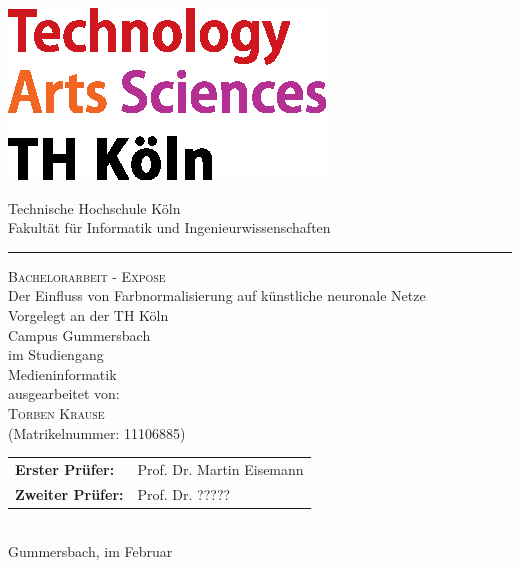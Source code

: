 \documentclass[a4paper,12pt,oneside]{article}
\begin{document}
  
  \pagestyle{empty}
  \begin{titlepage}
    \includegraphics[scale=1.00]{Sources/logo_TH-Koeln_CMYK_22pt}\\
    \begin{center}
      \Large
      Technische Hochschule Köln\\
      Fakultät für Informatik und Ingenieurwissenschaften\\
      \hrule\par\rule{0pt}{2cm} %
      \LARGE
      \textsc{Bachelorarbeit - Expose}\\
      \vspace{1cm} %
      \huge
      Der Einfluss von Farbnormalisierung auf künstliche neuronale Netze\\
      \vspace{1 cm}
      \large
      Vorgelegt an der TH Köln\\
      Campus Gummersbach\\
      im Studiengang\\
      Medieninformatik\\ 
      \vspace{1.0cm}
      ausgearbeitet von:\\
      \textsc{Torben Krause}\\
      (Matrikelnummer: 11106885)\\
      \vspace{1.5cm}
      \begin{tabular}{ll} %
          \textbf{Erster Prüfer:} & Prof. Dr. Martin Eisemann \\
          \textbf{Zweiter Prüfer:} & Prof. Dr. ????? \\
      \end{tabular}
      \vspace{1.5cm}
      \\Gummersbach, im Februar
    \end{center}    
  \end{titlepage}
    
\end{document}
